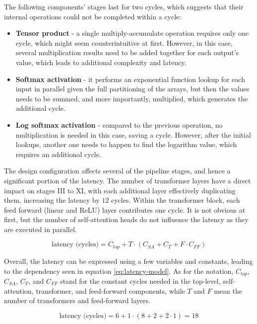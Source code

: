 The following components' stages last for two cycles, which suggests that their internal operations could not be completed within a cycle:

\begin{itemize}
  \item \textbf{Tensor product} - a single multiply-accumulate operation requires only one cycle, which might seem counterintuitive at first. However, in this case, several multiplication results need to be added together for each output's value, which leads to additional complexity and latency.
  \item \textbf{Softmax activation} - it performs an exponential function lookup for each input in parallel given the full partitioning of the arrays, but then the values needs to be summed, and more importantly, multiplied, which generates the additional cycle.
  \item \textbf{Log softmax activation} - compared to the previous operation, no multiplication is needed in this case, saving a cycle. However, after the initial lookups, another one needs to happen to find the logarithm value, which requires an additional cycle.
\end{itemize}

The design configuration affects several of the pipeline stages, and hence a significant portion of the latency. The number of transformer layers  have a direct impact on stages III to XI, with each additional layer effectively duplicating them, increasing the latency by \(12\) cycles. Within the transformer block, each feed forward (linear and ReLU) layer contributes one cycle. It is not obvious at first, but the number of self-attention heads do not influence the latency as they are executed in parallel.

\begin{equation} \label{eq:latency-model}
  \text{latency (cycles)} = C_{top} + T \cdot ( C_{SA} + C_{T} + F \cdot C_{FF} )
\end{equation}

Overall, the latency can be expressed using a few variables and constants, leading to the dependency seen in equation \ref{eq:latency-model}. As for the notation, \(C_{top}\), \(C_{SA}\), \(C_{T}\), and \(C_{FF}\) stand for the constant cycles needed in the top-level, self-attention, transformer, and feed-forward components, while \(T\) and \(F\) mean the number of transformers and feed-forward layers.

\begin{equation} \label{eq:latency-model-numbers}
  \text{latency (cycles)} = 6 + 1 \cdot ( 8 + 2 + 2 \cdot 1 ) = 18
\end{equation}

